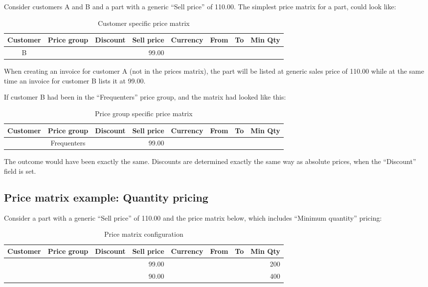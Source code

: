 Consider customers A and B and a part with a generic ``Sell price'' of 110.00.
The simplest price matrix for a part, could look like:

\begin{table}[H]
		\caption{Customer specific price matrix}
\begin{tabular}{|ccrrcrrr|}
	\hline
	\bf Customer & \bf Price group & \bf Discount &  \bf Sell price & \bf Currency & \bf From & \bf To & \bf Min Qty \\
	\hline
	B & & & 99.00 & & & & \\
	\hline
\end{tabular}
\end{table}


When creating an invoice for customer A (not in the prices matrix), the part will be listed at generic sales price of 110.00 while at the
same time an invoice for customer B lists it at 99.00.

If customer B had been in the ``Frequenters'' price group, and the matrix had looked like this:

\begin{table}[H]
	\caption{Price group specific price matrix}
	\begin{tabular}{|ccrrcrrr|}
		\hline
		\bf Customer & \bf Price group & \bf Discount &  \bf Sell price & \bf Currency & \bf From & \bf To & \bf Min Qty \\
		\hline
		 & Frequenters & & 99.00 & & & & \\
		\hline
	\end{tabular}
\end{table}

The outcome would have been exactly the same. Discounts are determined exactly the same way
as absolute prices, when the ``Discount'' field is set.


\subsection{Price matrix example: Quantity pricing}

Consider a part with a generic ``Sell price'' of 110.00 and the price matrix below, which includes
``Minimum quantity'' pricing:

\begin{table}[H]
	\caption{Price matrix configuration}
	\begin{tabular}{|ccrrcrrr|}
		\hline
		\bf Customer & \bf Price group & \bf Discount &  \bf Sell price & \bf Currency & \bf From & \bf To & \bf Min Qty \\
		\hline
		 & & & 99.00 & & & & 200 \\
		\hline
         & & & 90.00 & & & & 400 \\
		\hline
	\end{tabular}
\end{table}

